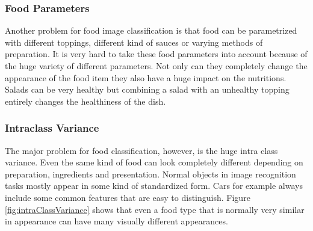 \subsubsection*{Food Parameters}
Another problem for food image classification is that food can be parametrized with different toppings, different kind of sauces or varying methods of preparation. It is very hard to take these food parameters into account because of the huge variety of different parameters. Not only can they completely change the appearance of the food item they also have a huge impact on the nutritions. Salads can be very healthy but combining a salad with an unhealthy topping entirely changes the healthiness of the dish.

\subsubsection*{Intraclass Variance}
The major problem for food classification, however, is the huge intra class variance. Even the same kind of food can look completely different depending on preparation, ingredients and presentation. Normal objects in image recognition tasks mostly appear in some kind of standardized form. Cars for example always include some common features that are easy to distinguish. Figure \ref{fig:intraClassVariance} shows that even a food type that is normally very similar in appearance can have many visually different appearances. 

